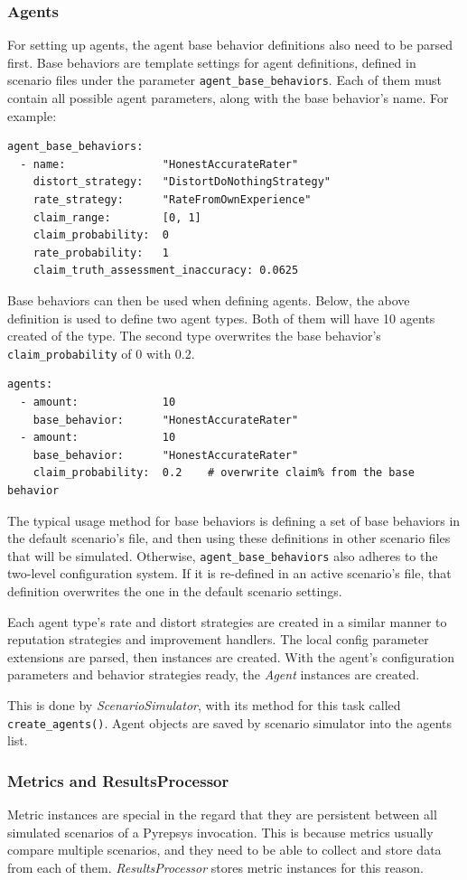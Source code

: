 \documentclass[%
    ]{\PathToTumTemplate/thesis/tum_thesis}
\begin{document}
\subsubsection{Agents}
For setting up agents, the agent base behavior definitions also need to be parsed first.
Base behaviors are template settings for agent definitions, defined in scenario files under the parameter \lstinline{agent_base_behaviors}.
Each of them must contain all possible agent parameters, along with the base behavior's name.
For example:
\begin{lstlisting}
agent_base_behaviors:
  - name: 				"HonestAccurateRater"
    distort_strategy: 	"DistortDoNothingStrategy"
    rate_strategy: 		"RateFromOwnExperience"
    claim_range: 		[0, 1]
    claim_probability: 	0
    rate_probability: 	1
    claim_truth_assessment_inaccuracy: 0.0625
\end{lstlisting}
Base behaviors can then be used when defining agents. Below, the above definition is used to define two agent types. Both of them will have 10 agents created of the type. The second type overwrites the base behavior's \lstinline{claim_probability} of 0 with 0.2.
\begin{lstlisting}
agents:
  - amount: 			10
  	base_behavior: 		"HonestAccurateRater"
  - amount: 			10
  	base_behavior: 		"HonestAccurateRater"
  	claim_probability: 	0.2    # overwrite claim% from the base behavior
\end{lstlisting}
The typical usage method for base behaviors is defining a set of base behaviors in the default scenario's file, and then using these definitions in other scenario files that will be simulated.
Otherwise, \lstinline{agent_base_behaviors} also adheres to the two-level configuration system.
If it is re-defined in an active scenario's file, that definition overwrites the one in the default scenario settings.

Each agent type's rate and distort strategies are created in a similar manner to reputation strategies and improvement handlers.
The local config parameter extensions are parsed, then instances are created.
With the agent's configuration parameters and behavior strategies ready, the \emph{Agent} instances are created.

This is done by \emph{ScenarioSimulator}, with its method for this task called \lstinline{create_agents()}.
Agent objects are saved by scenario simulator into the agents list.

\subsubsection{Metrics and ResultsProcessor}
Metric instances are special in the regard that they are persistent between all simulated scenarios of a Pyrepsys invocation.
This is because metrics usually compare multiple scenarios, and they need to be able to collect and store data from each of them.
\emph{ResultsProcessor} stores metric instances for this reason.
\end{document}
